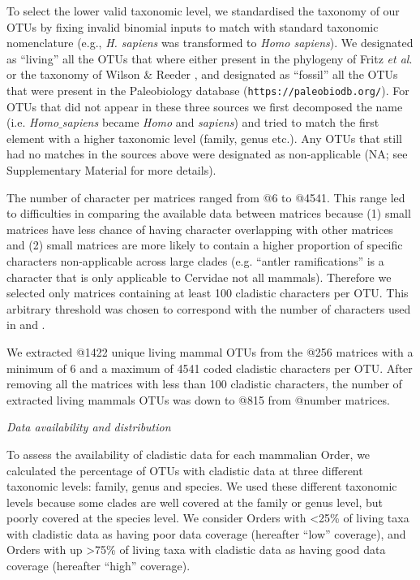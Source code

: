 \documentclass[12pt,letterpaper]{article}
\renewcommand{\subsection}[1]{%
\bigskip
\begin{center}
\begin{large}
\normalfont\itshape #1
\end{large}
\end{center}}
\begin{document}
To select the lower valid taxonomic level, we standardised the taxonomy of our OTUs by fixing invalid binomial inputs to match with standard taxonomic nomenclature (e.g., \textit{H. sapiens} was transformed to \textit{Homo sapiens}).
We designated as ``living'' all the OTUs that where either present in the phylogeny of Fritz \textit{et al}. \citep{FritzTree} or the taxonomy of Wilson \& Reeder \citep{wilson2005mammal}, and designated as ``fossil'' all the OTUs that were present in the Paleobiology database (\texttt{https://paleobiodb.org/}).
For OTUs that did not appear in these three sources we first decomposed the name (i.e. \textit{Homo$\_$sapiens} became \textit{Homo} and \textit{sapiens}) and tried to match the first element with a higher taxonomic level (family, genus etc.).
Any OTUs that still had no matches in the sources above were designated as non-applicable (NA; see Supplementary Material for more details).

The number of character per matrices ranged from @6 to @4541.
This range led to difficulties in comparing the available data between matrices because (1) small matrices have less chance of having character overlapping with other matrices \citep{wagner2000} and (2) small matrices are more likely to contain a higher proportion of specific characters non-applicable across large clades \citep{Brazeau2011} (e.g. ``antler ramifications'' is a character that is only applicable to Cervidae not all mammals).
Therefore we selected only matrices containing at least 100 cladistic characters per OTU.
This arbitrary threshold was chosen to correspond with the number of characters used in \citep{GuillermeCooper} and \citep{harrisonamong-character2014}.

We extracted @1422 unique living mammal OTUs from the @256 matrices with a minimum of 6 and a maximum of 4541 coded cladistic characters per OTU.
After removing all the matrices with less than 100 cladistic characters, the number of extracted living mammals OTUs was down to @815 from @number matrices.

\subsection{Data availability and distribution}
To assess the availability of cladistic data for each mammalian Order, we calculated the percentage of OTUs with cladistic data at three different taxonomic levels: family, genus and species.
We used these different taxonomic levels because some clades are well covered at the family or genus level, but poorly covered at the species level.
We consider Orders with \textless 25\% of living taxa with cladistic data as having poor data coverage (hereafter ``low'' coverage), and Orders with up \textgreater 75\% of living taxa with cladistic data as having good data coverage (hereafter ``high'' coverage). 
\end{document}

